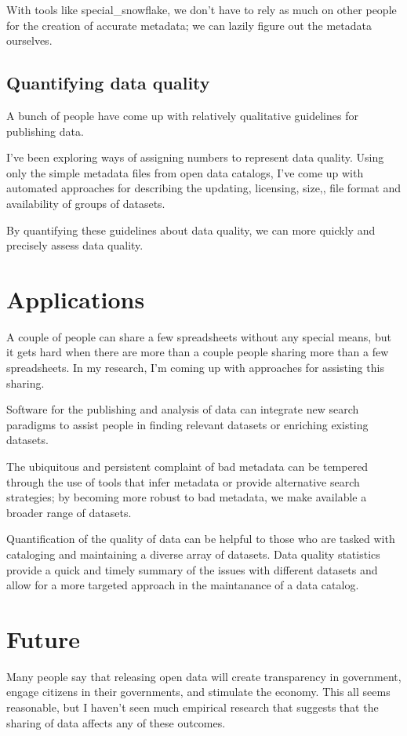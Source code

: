 \documentclass{acm_proc_article-sp}
\begin{document}
With tools like special\_snowflake, we don't have to rely as much on other
people for the creation of accurate metadata; we can lazily figure out the
metadata ourselves.

\subsection{Quantifying data quality}
A bunch of people\cite{open-data-census}\cite{five-stars}\cite{sunlight}\cite{sebastopol}\cite{odi}
have come up with relatively qualitative guidelines for publishing data.

I've been exploring ways of assigning numbers to represent data quality.
Using only the simple metadata files from open data catalogs, I've come up
with automated approaches for describing the updating,\cite{updatdness}
licensing,\cite{licensing} size,\cite{summary}, file format\cite{file-formats}
and availability\cite{dead}\cite{zombie} of groups of datasets.

By quantifying these guidelines about data quality, we can more quickly and
precisely assess data quality.

\section{Applications}
A couple of people can share a few spreadsheets without any special means,
but it gets hard when there are more than a couple people sharing more than
a few spreadsheets. In my research, I'm coming up with approaches for assisting
this sharing.

Software for the publishing and analysis of data can integrate new search
paradigms to assist people in finding relevant datasets or enriching existing
datasets.

The ubiquitous and persistent complaint of bad metadata can be tempered through
the use of tools that infer metadata or provide alternative search strategies;
by becoming more robust to bad metadata, we make available a broader range of
datasets.

Quantification of the quality of data can be helpful to those who are tasked
with cataloging and maintaining a diverse array of datasets. Data quality
statistics provide a quick and timely summary of the issues with different
datasets and allow for a more targeted approach in the maintanance of a
data catalog.

\section{Future}
Many people say that releasing open data will create transparency in government,
engage citizens in their governments, and stimulate the economy. This all seems
reasonable, but I haven't seen much empirical research that suggests that the
sharing of data affects any of these outcomes.
\end{document}

